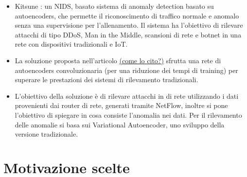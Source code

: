 \begin{itemize}
\item Kitsune \cite{kitsune}: un NIDS, basato sistema di anomaly detection basato su autoencoders, che permette il riconoscimento di traffico normale e anomalo senza una supervisione per l'allenamento. Il sistema ha l'obiettivo di rilevare attacchi di tipo DDoS, Man in the Middle, scansioni di rete e botnet in una rete con dispositivi tradizionali e IoT.
\item La soluzione proposta nell'articolo  \uline{(come lo cito?)} \cite{chen_autoencoders} sfrutta una rete di autoencoders convoluzionaria (per una riduzione dei tempi di training) per superare le prestazioni dei sistemi di rilevamento tradizionali.
\item L'obiettivo della soluzione \cite{vae_autoencoders} è di rilevare attacchi in di rete utilizzando i dati provenienti dai router di rete, generati tramite NetFlow, inoltre si pone l'obiettivo di spiegare in cosa consiste l'anomalia nei dati. Per il rilevamento delle anomalie si basa sui Variational Autoencoder, uno sviluppo della versione tradizionale.

\end{itemize}

\section{Motivazione scelte}





